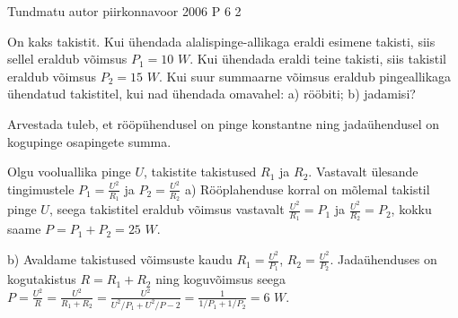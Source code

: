 {Tundmatu autor} %
{piirkonnavoor} %
{2006} %
{P 6} %
{2} %
{

\ifStatement
On kaks takistit. Kui ühendada alalispinge-allikaga eraldi esimene takisti, siis sellel eraldub võimsus $P_1 = 10$ $W$. Kui ühendada eraldi teine takisti, siis takistil eraldub võimsus $P_2 = 15$ $W$. Kui suur summaarne võimsus eraldub pingeallikaga ühendatud takistitel, kui nad ühendada omavahel: a) rööbiti; b) jadamisi?
\fi

\ifHint
Arvestada tuleb, et rööpühendusel on pinge konstantne ning jadaühendusel on kogupinge osapingete summa.
\fi

\ifSolution
Olgu vooluallika pinge $U$, takistite takistused $R_1$ ja $R_2$. Vastavalt ülesande tingimustele
$P_1 = \frac{U^2}{R_1}$ ja $P_2 = \frac{U^2}{R_2}$
a) Rööplahenduse korral on mõlemal takistil pinge $U$, seega takistitel eraldub võimsus vastavalt 
$\frac{U^2}{R_1} = P_1$ ja $\frac{U^2}{R_2} = P_2$,
kokku saame $P = P_1 + P_2 = 25$ $W$.

b) Avaldame takistused võimsuste kaudu
$R_1 = \frac{U^2}{P_1}$, $R_2 = \frac{U^2}{P_2}$.
Jadaühenduses on kogutakistus $R = R_1 + R_2 $ ning koguvõimsus seega
$P = \frac{U^2}{R} = \frac{U^2}{R_1 + R_2} = \frac{U^2}{U^2 / P_1 + U^2/P-2} = \frac{1}{1/P_1 + 1/P_2} = 6$ $W$.
\fi
}